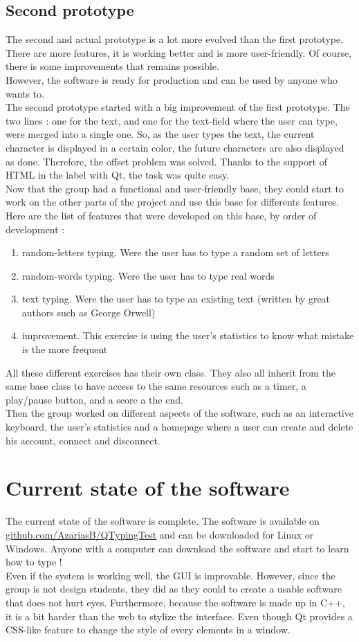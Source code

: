 \section{Second prototype}
The second and actual prototype is a lot more evolved than the first prototype. There are more features, it is working better and is more user-friendly. Of course, there is some improvements that remains possible.\\
However, the software is ready for production and can be used by anyone who wants to.\\
The second prototype started with a big improvement of the first prototype. The two lines : one for the text, and one for the text-field where the user can type, were merged into a single one. So, as the user types the text, the current character is displayed in a certain color, the future characters are also displayed as done. Therefore, the offset problem was solved. Thanks to the support of HTML in the label with Qt, the task was quite easy.\\
Now that the group had a functional and user-friendly base, they could start to work on the other parts of the project and use this base for differents features.\\
Here are the list of features that were developed on this base, by order of development :
\begin{enumerate}
	\item random-letters typing. Were the user has to type a random set of letters
	\item random-words typing. Were the user has to type real words
	\item text typing. Were the user has to type an existing text (written by great authors such as George Orwell)
	\item improvement. This exercise is using the user's statistics to know what mistake is the more frequent
\end{enumerate}
All these different exercises has their own class. They also all inherit from the same base class to have access to the same resources such as a timer, a play/pause button, and a score a the end.\\
Then the group worked on different aspects of the software, such as an interactive keyboard, the user's statistics and a homepage where a user can create and delete his account, connect and disconnect.


\chapter{Current state of the software}
The current state of the software is complete. The software is available on \url{github.com/AzariasB/QTypingTest} and can be downloaded for Linux or Windows. Anyone with a computer can download the software and start to learn how to type !\\
Even if the system is working well, the GUI is improvable. However, since the group is not design students, they did as they could to create a usable software that does not hurt eyes. Furthermore, because the software is made up in C++, it is a bit harder than the web to stylize the interface. Even though Qt provides a CSS-like feature to change the style of every elements in a window.


